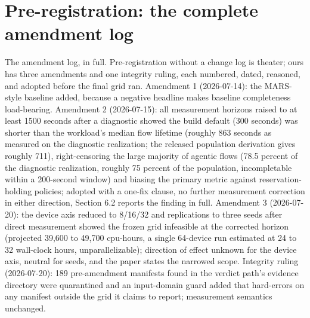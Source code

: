\section{Pre-registration: the complete amendment log}

The amendment log, in full. Pre-registration without a change log is
theater; ours has three amendments and one integrity ruling, each numbered,
dated, reasoned, and adopted before the final grid ran. Amendment 1
(2026-07-14): the MARS-style baseline added, because a negative headline
makes baseline completeness load-bearing. Amendment 2 (2026-07-15): all
measurement horizons raised to at least 1500 seconds after a diagnostic
showed the build default (300 seconds) was shorter than the workload's
median flow lifetime (roughly 863 seconds as measured on the diagnostic
realization; the released population derivation gives roughly 711),
right-censoring the large majority of agentic flows (78.5 percent of the
diagnostic realization, roughly 75 percent of the population,
incompletable within a 200-second window) and biasing the primary metric against
reservation-holding policies; adopted with a one-fix clause, no further
measurement correction in either direction, Section 6.2 reports the finding
in full. Amendment 3 (2026-07-20): the device axis reduced to 8/16/32 and
replications to three seeds after direct measurement showed the frozen grid
infeasible at the corrected horizon (projected 39,600 to 49,700 cpu-hours, a single 64-device run
estimated at 24 to 32 wall-clock hours, unparallelizable); direction of effect unknown for the
device axis, neutral for seeds, and the paper states the narrowed scope.
Integrity ruling (2026-07-20): 189 pre-amendment manifests found in the
verdict path's evidence directory were quarantined and an input-domain
guard added that hard-errors on any manifest outside the grid it claims to
report; measurement semantics unchanged.
